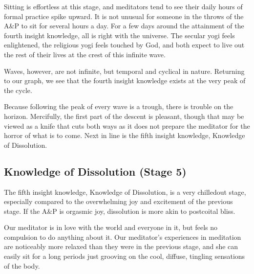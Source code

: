 \documentclass[a5paper,10pt,english]{book}
\begin{document}
\sphinxAtStartPar
Sitting is effortless at this stage, and meditators tend to see their
daily hours of formal practice spike upward. It is not unusual for
someone in the throws of the A\&P to sit for several hours a day. For a
few days around the attainment of the fourth insight knowledge, all is
right with the universe. The secular yogi feels enlightened, the
religious yogi feels touched by God, and both expect to live out the
rest of their lives at the crest of this infinite wave.

\sphinxAtStartPar
Waves, however, are not infinite, but temporal and cyclical in nature.
Returning to our graph, we see that the fourth insight knowledge exists
at the very peak of the cycle.

\sphinxAtStartPar
Because following the peak of every wave is a trough, there is trouble
on the horizon. Mercifully, the first part of the descent is pleasant,
though that may be viewed as a knife that cuts both ways as it does not
prepare the meditator for the horror of what is to come. Next in line is
the fifth insight knowledge, Knowledge of Dissolution.


\subsection{Knowledge of Dissolution (Stage 5)}
\label{\detokenize{main-2:knowledge-of-dissolution-stage-5}}
\sphinxAtStartPar
The fifth insight knowledge, Knowledge of Dissolution, is a very
chilled\sphinxhyphen{}out stage, especially compared to the overwhelming joy and
excitement of the previous stage. If the A\&P is orgasmic joy,
dissolution is more akin to post\sphinxhyphen{}coital bliss.

\sphinxAtStartPar
Our meditator is in love with the world and everyone in it, but feels no
compulsion to do anything about it. Our meditator’s experiences in
meditation are noticeably more relaxed than they were in the previous
stage, and she can easily sit for a long periods just grooving on the
cool, diffuse, tingling sensations of the body.
\end{document}
